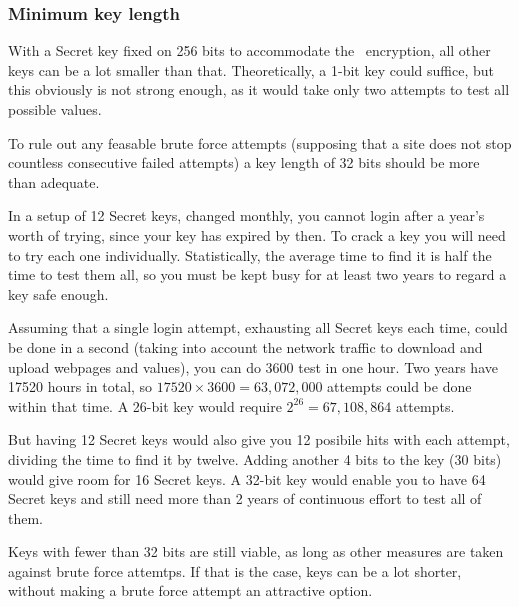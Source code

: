 \subsubsection{Minimum key length}
With a Secret key fixed on 256 bits to accommodate the \AES\ encryption,
all other keys can be a lot smaller than that.
Theoretically,
a 1-bit key could suffice,
but this obviously is not strong enough,
as it would take only two attempts to test all possible values.
\par
To rule out any feasable brute force attempts
(supposing that a site does not stop countless consecutive failed attempts)
a key length of 32 bits should be more than adequate.
\par
In a setup of 12 Secret keys, changed monthly,
you cannot login after a year's worth of trying,
since your key has expired by then.
To crack a key you will need to try each one individually.
Statistically, the average time to find it is half the time to test them all,
so you must be kept busy for at least two years to regard a key safe enough.
\par
Assuming that a single login attempt,
exhausting all Secret keys each time,
could be done in a second
(taking into account the network traffic to download and upload webpages and values),
you can do 3600 test in one hour.
Two years have 17520 hours in total,
so $17520\times 3600=63,072,000$ attempts could be done within that time.
A 26-bit key would require $2^{26}=67,108,864$ attempts.
\par
But having 12 Secret keys would also give you 12 posibile hits with each attempt,
dividing the time to find it by twelve.
Adding another 4 bits to the key
(30 bits)
would give room for 16 Secret keys.
A 32-bit key would enable you to have 64 Secret keys and still need more than 2 years of continuous effort to test all of them.
\par
Keys with fewer than 32 bits are still viable,
as long as other measures are taken against brute force attemtps.
If that is the case,
keys can be a lot shorter,
without making a brute force attempt an attractive option.

